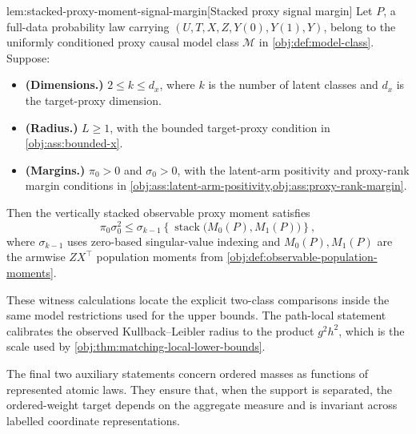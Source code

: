 \begin{lemmav}{lem:stacked-proxy-moment-signal-margin}[Stacked proxy signal margin]
Let \(P\), a full-data probability law carrying \((U,T,X,Z,Y(0),Y(1),Y)\), belong to the uniformly conditioned proxy causal model class \(\mathcal M\) in \cref{obj:def:model-class}. Suppose:
\begin{itemize}
\item \textbf{(Dimensions.)} \(2\le k\le d_x\), where \(k\) is the number of latent classes and \(d_x\) is the target-proxy dimension.
\item \textbf{(Radius.)} \(L\ge 1\), with the bounded target-proxy condition in \cref{obj:ass:bounded-x}.
\item \textbf{(Margins.)} \(\pi_0>0\) and \(\sigma_0>0\), with the latent-arm positivity and proxy-rank margin conditions in \cref{obj:ass:latent-arm-positivity,obj:ass:proxy-rank-margin}.
\end{itemize}
Then the vertically stacked observable proxy moment satisfies
\[
\pi_0\sigma_0^2
\le
\sigma_{k-1}\!\left\{\operatorname{stack}\bigl(M_0(P),M_1(P)\bigr)\right\},
\]
where \(\sigma_{k-1}\) uses zero-based singular-value indexing and \(M_0(P),M_1(P)\) are the armwise \(ZX^\top\) population moments from \cref{obj:def:observable-population-moments}.
\end{lemmav}

These witness calculations locate the explicit two-class comparisons inside the same model restrictions used for the upper bounds. The path-local statement calibrates the observed Kullback--Leibler radius to the product \(g^2h^2\), which is the scale used by \cref{obj:thm:matching-local-lower-bounds}.

The final two auxiliary statements concern ordered masses as functions of represented atomic laws. They ensure that, when the support is separated, the ordered-weight target depends on the aggregate measure and is invariant across labelled coordinate representations.


